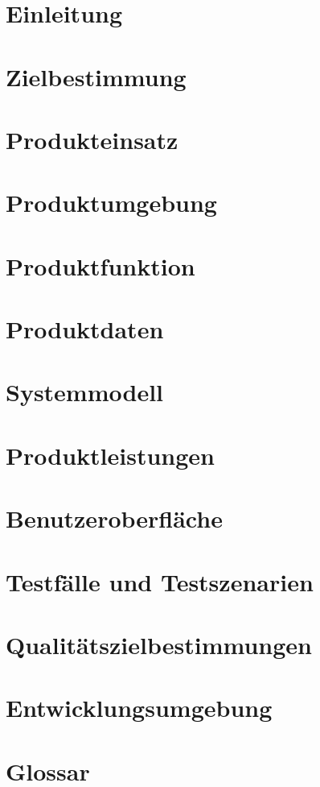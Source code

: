 

	\maketitle
	\setcounter{tocdepth}{1}
	\tableofcontents
	\chapter{Einleitung}
		
	\chapter{Zielbestimmung}
		
	\chapter{Produkteinsatz}
		
	\chapter{Produktumgebung}
		
	\chapter{Produktfunktion}
		
	\chapter{Produktdaten}
		
	\chapter{Systemmodell}
		
	\chapter{Produktleistungen}
		
	\chapter{Benutzeroberfläche}
		
	\chapter{Testfälle und Testszenarien}
		
	\chapter{Qualitätszielbestimmungen}
		
	\chapter{Entwicklungsumgebung}
		
	\chapter{Glossar}
		
